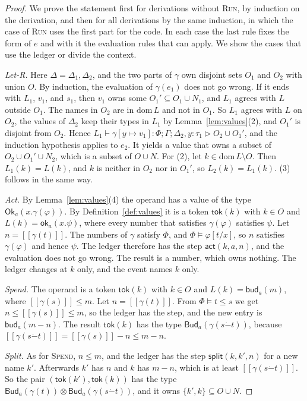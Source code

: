 \documentclass[acmsmall,nonacm,screen]{acmart}
\newcommand{\kw}[1]{\mathsf{#1}}
\newcommand{\Ok}[2]{\kw{Ok}_{#1}(#2)}
\newcommand{\Bud}[2]{\kw{Bud}_{#1}(#2)}
\newcommand{\ok}[2]{\kw{ok}_{#1}(#2)}
\newcommand{\bud}[2]{\kw{bud}_{#1}(#2)}
\newcommand{\tok}[1]{\kw{tok}(#1)}
\newcommand{\sem}[1]{[\![#1]\!]}
\newcommand{\monus}{\mathbin{\dot{-}}}
\newcommand{\dom}{\mathrm{dom}\,}
\newcommand{\own}{\mathrel{\triangleright}}
\newcommand{\evact}{\kw{act}}
\newcommand{\evsplit}{\kw{split}}
\begin{document}
\begin{proof}
We prove the statement first for derivations without \textsc{Run}, by induction on the
derivation, and then for all derivations by the same induction, in which the case of
\textsc{Run} uses the first part for the code. In each case the last rule fixes the form of
$e$ and with it the evaluation rules that can apply. We show the cases that use the ledger or
divide the context.

\emph{Let-R.} Here $\Delta = \Delta_1, \Delta_2$, and the two parts of $\gamma$ own disjoint
sets $O_1$ and $O_2$ with union $O$. By induction, the evaluation of $\gamma(e_1)$ does not go
wrong. If it ends with $L_1$, $v_1$, and $s_1$, then $v_1$ owns some
$O_1' \subseteq O_1 \cup N_1$, and $L_1$ agrees with $L$ outside $O_1$. The names in $O_2$ are
in $\dom L$ and not in $O_1$. So $L_1$ agrees with $L$ on $O_2$, the values of $\Delta_2$ keep
their types in $L_1$ by Lemma~\ref{lem:values}(2), and $O_1'$ is disjoint from $O_2$. Hence
$L_1 \vdash \gamma[y \mapsto v_1] : \Phi; \Gamma; \Delta_2, y{:}\tau_1 \own O_2 \cup O_1'$, and
the induction hypothesis applies to $e_2$. It yields a value that owns a subset of
$O_2 \cup O_1' \cup N_2$, which is a subset of $O \cup N$. For (2), let
$k \in \dom L \setminus O$. Then $L_1(k) = L(k)$, and $k$ is neither in $O_2$ nor in $O_1'$,
so $L_2(k) = L_1(k)$. (3) follows in the same way.

\emph{Act.} By Lemma~\ref{lem:values}(4) the operand has a value of the type
$\Ok{a}{x.\gamma(\varphi)}$. By Definition~\ref{def:values} it is a token $\tok{k}$ with
$k \in O$ and $L(k) = \ok{a}{x.\psi}$, where every number that satisfies $\gamma(\varphi)$
satisfies $\psi$. Let $n = \sem{\gamma(t)}$. The numbers of $\gamma$ satisfy $\Phi$, and
$\Phi \models \varphi[t/x]$, so $n$ satisfies $\gamma(\varphi)$ and hence $\psi$. The ledger
therefore has the step $\evact(k, a, n)$, and the evaluation does not go wrong. The result is
a number, which owns nothing. The ledger changes at $k$ only, and the event names $k$ only.

\emph{Spend.} The operand is a token $\tok{k}$ with $k \in O$ and $L(k) = \bud{a}{m}$, where
$\sem{\gamma(s)} \le m$. Let $n = \sem{\gamma(t)}$. From $\Phi \models t \le s$ we get
$n \le \sem{\gamma(s)} \le m$, so the ledger has the step, and the new entry is
$\bud{a}{m - n}$. The result $\tok{k}$ has the type $\Bud{a}{\gamma(s \monus t)}$, because
$\sem{\gamma(s \monus t)} = \sem{\gamma(s)} - n \le m - n$.

\emph{Split.} As for \textsc{Spend}, $n \le m$, and the ledger has the step
$\evsplit(k, k', n)$ for a new name $k'$. Afterwards $k'$ has $n$ and $k$ has $m - n$, which
is at least $\sem{\gamma(s \monus t)}$. So the pair $(\tok{k'}, \tok{k})$ has the type
$\Bud{a}{\gamma(t)} \otimes \Bud{a}{\gamma(s \monus t)}$, and it owns
$\{k', k\} \subseteq O \cup N$.


\end{proof}
\end{document}
